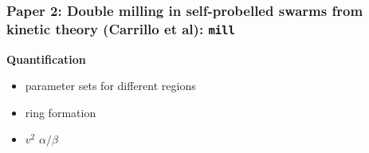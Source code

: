 \documentclass[compress]{beamer}
\begin{document}
\begin{frame}
	\frametitle{Paper 2: Double milling in self-probelled swarms from kinetic theory (Carrillo et al): \texttt{mill}}
	
	\textbf{Quantification}
	
\begin{itemize}
	\item parameter sets for different regions
	\item ring formation 
	\item \( v^{2} \)  \( \alpha / \beta \)
\end{itemize}
	
\end{frame}
\end{document}
